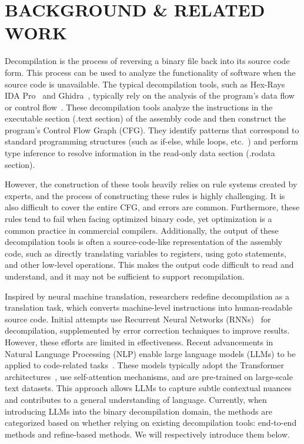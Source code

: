 \section{BACKGROUND \& RELATED WORK}
\label{sec:rel}

Decompilation is the process of reversing a binary file back into its source code form.
This process can be used to analyze the functionality of software when the source code is unavailable.
The typical decompilation tools, such as Hex-Rays IDA Pro~\citep{idapro} and Ghidra~\citep{ghidra}, typically rely on the analysis of the program's data flow or control flow~\citep{decompilation1}.
These decompilation tools analyze the instructions in the executable section (.text section) of the assembly code and then construct the program's Control Flow Graph (CFG). 
They identify patterns that correspond to standard programming structures (such as if-else, while loops, etc.~\citep{for_loop}) and perform type inference to resolve information in the read-only data section (.rodata section).

However, the construction of these tools heavily relies on rule systems created by experts, and the process of constructing these rules is highly challenging.
It is also difficult to cover the entire CFG, and errors are common.
Furthermore, these rules tend to fail when facing optimized binary code, yet optimization is a common practice in commercial compilers.
Additionally, the output of these decompilation tools is often a source-code-like representation of the assembly code, such as directly translating variables to registers, using goto statements, and other low-level operations.
This makes the output code difficult to read and understand, and it may not be sufficient to support recompilation.


Inspired by neural machine translation, researchers redefine decompilation as a translation task, which converts machine-level instructions into human-readable source code.
Initial attempts use Recurrent Neural Networks (RNNs)~\citep{decompilation2_rnn} for decompilation, supplemented by error correction techniques to improve results.
However, these efforts are limited in effectiveness.
Recent advancements in Natural Language Processing (NLP) enable large language models (LLMs) to be applied to code-related tasks~\citep{codellama, starcoder, deepseekcoder}. 
These models typically adopt the Transformer architectures~\citep{transformers}, use self-attention mechanisms, and are pre-trained on large-scale text datasets.
This approach allows LLMs to capture subtle contextual nuances and contributes to a general understanding of language.
Currently, when introducing LLMs into the binary decompilation domain, the methods are categorized based on whether relying on existing decompilation tools: end-to-end methods and refine-based methods. 
We will respectively introduce them below.

